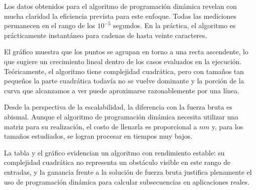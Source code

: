 Los datos obtenidos para el algoritmo de programación dinámica revelan con mucha claridad la eficiencia prevista para este enfoque. Todas las mediciones permanecen en el rango de los $10^{-5}$ segundos. En la práctica, el algoritmo es prácticamente instantáneo para cadenas de hasta veinte caracteres.

\vspace{0.5 cm}

El gráfico muestra que los puntos se agrupan en torno a una recta ascendente, lo que sugiere un crecimiento lineal dentro de los casos evaluados en la ejecución. Teóricamente, el algoritmo tiene complejidad cuadrática, pero con tamaños tan pequeños la parte cuadrática todavía no se vuelve dominante y la porción de la curva que alcanzamos a ver puede aproximarse razonablemente por una línea.

\vspace{0.5 cm}

Desde la perspectiva de la escalabilidad, la diferencia con la fuerza bruta es abismal. Aunque el algoritmo de programación dinámica necesita utilizar una matriz para su realización, el costo de llenarla es proporcional a $nm$ y, para los tamaños estudiados, se logran procesar en tiempos muy bajos.

\vspace{0.5 cm}

La tabla y el gráfico evidencian un algoritmo con rendimiento estable: su complejidad cuadrática no representa un obstáculo visible en este rango de entradas, y la ganancia frente a la solución de fuerza bruta justifica plenamente el uso de programación dinámica para calcular subsecuencias en aplicaciones reales.
